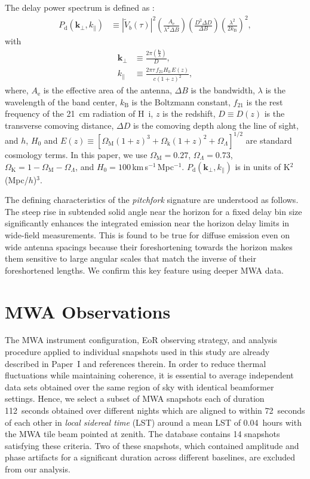 \documentclass[preprint2,apjl,numberedappendix,twocolappendix,appendixfloats]{emulateapj}
\begin{document}
The delay power spectrum is defined as \citep[][Paper~I]{par12a}:
\begin{align}\label{eqn:delay-power-spectrum}
  P_\textrm{d}(\boldsymbol{k}_\perp,k_\parallel) &\equiv |\widetilde{V}_b(\tau)|^2\left(\frac{A_\textrm{e}}{\lambda^2\Delta B}\right)\left(\frac{D^2\Delta D}{\Delta B}\right)\left(\frac{\lambda^2}{2k_\textrm{B}}\right)^2,
\end{align}
with
\begin{align}
  \boldsymbol{k}_\perp &\equiv \frac{2\pi(\frac{\boldsymbol{b}}{\lambda})}{D}, \\
  k_\parallel &\equiv \frac{2\pi\tau\,f_{21}H_0\,E(z)}{c(1+z)^2}, 
\end{align}
where, $A_\textrm{e}$ is the effective area of the antenna, $\Delta B$ is the bandwidth, $\lambda$ is the wavelength of the band center, $k_\textrm{B}$ is the Boltzmann constant, $f_{21}$ is the rest frequency of the 21~cm radiation of H~{\sc i}, $z$ is the redshift, $D\equiv D(z)$ is the transverse comoving distance, $\Delta D$ is the comoving depth along the line of sight, and $h$, $H_0$ and $E(z)\equiv [\Omega_\textrm{M}(1+z)^3+\Omega_\textrm{k}(1+z)^2+\Omega_\Lambda]^{1/2}$ are standard cosmology terms. In this paper, we use $\Omega_\textrm{M}=0.27$, $\Omega_\Lambda=0.73$, $\Omega_\textrm{K}=1-\Omega_\textrm{M}-\Omega_\Lambda$, and $H_0=100\,$km$\,$s$^{-1}\,$Mpc$^{-1}$. $P_\textrm{d}(\boldsymbol{k}_\perp,k_\parallel)$ is in units of K$^2$(Mpc/$h$)$^3$.

The defining characteristics of the {\it pitchfork} signature are understood as follows. The steep rise in subtended solid angle near the horizon for a fixed delay bin size significantly enhances the integrated emission near the horizon delay limits in wide-field measurements. This is found to be true for diffuse emission even on wide antenna spacings because their foreshortening towards the horizon makes them sensitive to large angular scales that match the inverse of their foreshortened lengths. We confirm this key feature using deeper MWA data.

\section{MWA Observations}\label{sec:MWA}

The MWA instrument configuration, EoR observing strategy, and analysis procedure applied to individual snapshots used in this study are already described in Paper~I and references therein. In order to reduce thermal fluctuations while maintaining coherence, it is essential to average independent data sets obtained over the same region of sky with identical beamformer settings. Hence, we select a subset of MWA snapshots each of duration 112~seconds obtained over different nights which are aligned to within 72~seconds of each other in {\it local sidereal time} (LST) around a mean LST of 0.04~hours with the MWA tile beam pointed at zenith. The database contains 14 snapshots satisfying these criteria. Two of these snapshots, which contained amplitude and phase artifacts for a significant duration across different baselines, are excluded from our analysis. 
\end{document}
